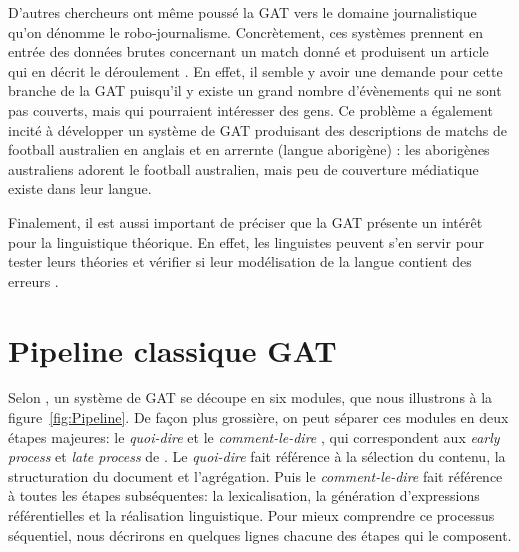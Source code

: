 D'autres chercheurs ont même poussé la \ac{GAT} vers le domaine journalistique qu'on dénomme le robo-journalisme. Concrètement, ces systèmes prennent en entrée des données brutes concernant un match donné et produisent un article qui en décrit le déroulement \citep{W17-3513}. En effet, il semble y avoir une demande pour cette branche de la \ac{GAT} puisqu'il y existe un grand nombre d'évènements qui ne sont pas couverts, mais qui pourraient intéresser des gens. Ce problème a également incité \citeauthor{dras12} à développer un système de \ac{GAT} produisant des descriptions de matchs de football australien en anglais et en arrernte (langue aborigène) \citep{lareau11a,dras12}: les aborigènes australiens adorent le football australien, mais peu de couverture médiatique existe dans leur langue.

Finalement, il est aussi important de préciser que la \ac{GAT} présente un intérêt pour la linguistique théorique. En effet, les linguistes peuvent s'en servir pour tester leurs théories et vérifier si leur modélisation de la langue contient des erreurs \citep{DanlosPresentationmodelegeneration1983}. 


\section{Pipeline classique GAT} \label{ppc}

Selon \cite{ReiterBuildingNaturalLanguage2000}, un système de \ac{GAT} se découpe en six modules, que nous illustrons à la figure~\ref{fig:Pipeline}. De façon plus grossière, on peut séparer ces modules en deux étapes majeures: le \emph{quoi-dire} et le \emph{comment-le-dire} \citep{DanlosPresentationmodelegeneration1983}, qui correspondent aux \emph{early process} et \emph{late process} de \cite{gatt18}. Le \emph{quoi-dire} fait référence à la sélection du contenu, la structuration du document et l'agrégation. Puis le \emph{comment-le-dire} fait référence à toutes les étapes subséquentes: la lexicalisation, la génération d'expressions référentielles et la réalisation linguistique. Pour mieux comprendre ce processus séquentiel, nous décrirons en quelques lignes chacune des étapes qui le composent.

